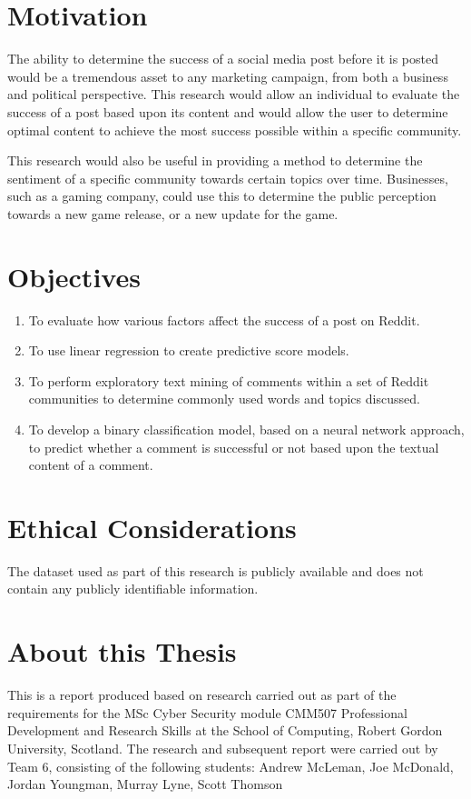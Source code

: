 \section{Motivation}
The ability to determine the success of a social media post before it is posted would be a tremendous asset to any marketing campaign, from both a business and political perspective. This research would allow an individual to evaluate the success of a post based upon its content and would allow the user to determine optimal content to achieve the most success possible within a specific community.

This research would also be useful in providing a method to determine the sentiment of a specific community towards certain topics over time. Businesses, such as a gaming company, could use this to determine the public perception towards a new game release, or a new update for the game.

\section{Objectives}
\begin{enumerate}
\item To evaluate how various factors affect the success of a post on Reddit.
\item To use linear regression to create predictive score models.
\item To perform exploratory text mining of comments within a set of Reddit communities to determine commonly used words and topics discussed.
\item To develop a binary classification model, based on a neural network approach, to predict whether a comment is successful or not based upon the textual content of a comment.
\end{enumerate}

\section{Ethical Considerations}
The dataset used as part of this research is publicly available and does not contain any publicly identifiable information.

\section{About this Thesis}
This is a report produced based on research carried out as part of the requirements for the MSc Cyber Security module CMM507 Professional Development and Research Skills at the School of Computing, Robert Gordon University, Scotland.
The research and subsequent report were carried out by Team 6, consisting of the following students:
Andrew McLeman, Joe McDonald, Jordan Youngman, Murray Lyne, Scott Thomson

